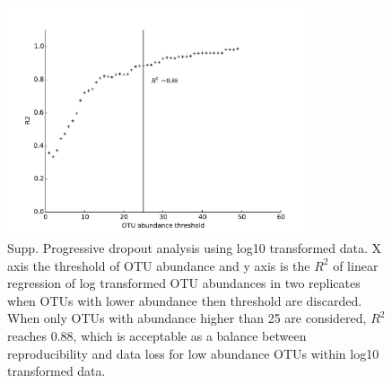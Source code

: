 \documentclass[12pt]{article}
\begin{document}
\begin{figure}[tbph!]
  \centering
  \includegraphics[width=0.8\textwidth]{figs/SB1_techrep_OTUscatR2}

  \caption[Progressive dropout analysis using log10 transformed
  data]{Supp. Progressive dropout analysis using log10 transformed
  data. X axis the threshold of OTU abundance and y axis is the $R^2$
  of linear regression of log transformed OTU abundances in two
  replicates when OTUs with lower abundance then threshold are
  discarded. When only OTUs with abundance higher than 25 are
  considered, $R^2$ reaches 0.88, which is acceptable as a balance
  between reproducibility and data loss for low abundance OTUs within
  log10 transformed data.}

  \label{fig:SB1_techrep_OTUscatR2}
\end{figure}
\end{document}
